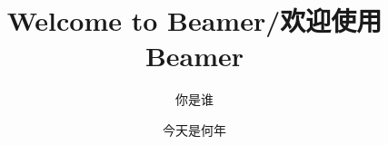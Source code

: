 \documentclass{beamer}
\title{Welcome to Beamer/欢迎使用Beamer}
\author{你是谁}
\institute{你在哪}
\date{今天是何年}
\begin{document}
\begin{frame}
\titlepage %
\end{frame}
\end{document}
